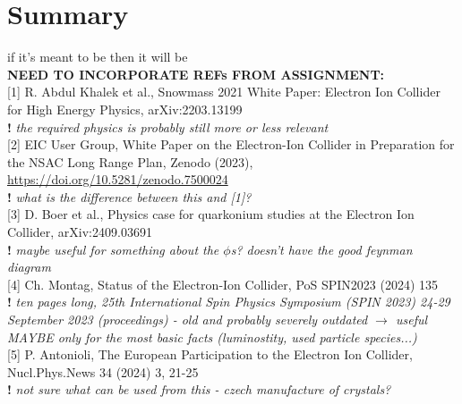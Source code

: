 \chapter*{Summary}\label{cha:outro} %

if it's meant to be then it will be\\

\textbf{NEED TO INCORPORATE REFs FROM ASSIGNMENT:}\\

[1] R. Abdul Khalek et al., Snowmass 2021 White Paper: Electron Ion Collider for High Energy Physics, arXiv:2203.13199\\
\textbf{!} \textit{the required physics is probably still more or less relevant}\\

[2] EIC User Group,  White Paper on the Electron-Ion Collider in Preparation for the NSAC Long Range Plan, Zenodo (2023), \url{https://doi.org/10.5281/zenodo.7500024}\\
\textbf{!} \textit{what is the difference between this and [1]?}\\

[3] D. Boer et al., Physics case for quarkonium studies at the Electron Ion Collider, arXiv:2409.03691\\
\textbf{!} \textit{maybe useful for something about the $\phi$s? doesn't have the good feynman diagram}\\

[4] Ch. Montag, Status of the Electron-Ion Collider, PoS SPIN2023 (2024) 135\\
\textbf{!} \textit{ten pages long, 25th International Spin Physics Symposium (SPIN 2023) 24-29 September 2023 (proceedings) - old and probably severely outdated $\rightarrow$ useful MAYBE only for the most basic facts (luminostity, used particle species...)}\\

[5] P. Antonioli, The European Participation to the Electron Ion Collider, Nucl.Phys.News 34 (2024) 3, 21-25\\
\textbf{!} \textit{not sure what can be used from this - czech manufacture of crystals?}

